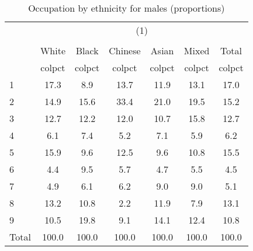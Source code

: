 \begin{table}[htbp]\centering
\def\sym#1{\ifmmode^{#1}\else\(^{#1}\)\fi}
\caption{Occupation by ethnicity for males (proportions)}
\begin{tabular}{l*{6}{c}}
\hline\hline
          &\multicolumn{6}{c}{(1)}                                    \\
          &\multicolumn{6}{c}{}                                       \\
          &    White&    Black&  Chinese&    Asian&    Mixed&    Total\\
          &   colpct&   colpct&   colpct&   colpct&   colpct&   colpct\\
\hline
1         &     17.3&      8.9&     13.7&     11.9&     13.1&     17.0\\
2         &     14.9&     15.6&     33.4&     21.0&     19.5&     15.2\\
3         &     12.7&     12.2&     12.0&     10.7&     15.8&     12.7\\
4         &      6.1&      7.4&      5.2&      7.1&      5.9&      6.2\\
5         &     15.9&      9.6&     12.5&      9.6&     10.8&     15.5\\
6         &      4.4&      9.5&      5.7&      4.7&      5.5&      4.5\\
7         &      4.9&      6.1&      6.2&      9.0&      9.0&      5.1\\
8         &     13.2&     10.8&      2.2&     11.9&      7.9&     13.1\\
9         &     10.5&     19.8&      9.1&     14.1&     12.4&     10.8\\
Total     &    100.0&    100.0&    100.0&    100.0&    100.0&    100.0\\
\hline\hline
\end{tabular}
\end{table}

